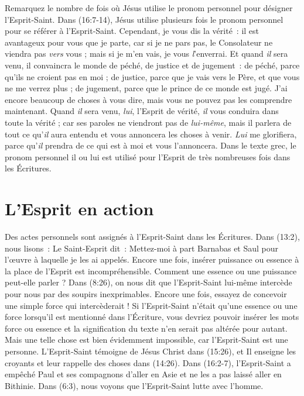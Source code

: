 Remarquez le nombre de fois où Jésus utilise le pronom personnel pour
 désigner l'Esprit-Saint. Dans (16:7-14), Jésus utilise
 plusieurs fois le pronom personnel pour se référer à l'Esprit-Saint.
 \og Cependant, je vous dis la vérité~: il est avantageux pour vous
 que je parte, car si je ne pars pas, le Consolateur ne viendra pas
 \emph{vers} vous ; mais si je m'en vais, je vous \emph{l}'enverrai.
 Et quand \emph{il} sera venu, il convaincra le monde de péché,
 de justice et de jugement~: de péché, parce qu'ils ne croient pas en moi ;
 de justice, parce que je vais vers le Père, et que vous ne me verrez plus ;
 de jugement, parce que le prince de ce monde est jugé.
 J'ai encore beaucoup de choses à vous dire, mais vous ne pouvez pas
 les comprendre maintenant. Quand \emph{il} sera venu, \emph{lui},
 l'Esprit de vérité, \emph{il} vous conduira dans toute la vérité ;
 car ses paroles ne viendront pas de \emph{lui-même}, mais il parlera de
 tout ce qu'\emph{il} aura entendu et vous annoncera les choses à venir.
 \emph{Lui} me glorifiera, parce qu'\emph{il} prendra de ce qui est à moi
 et vous l'annoncera. \fg{}
 Dans le texte grec, le pronom personnel \og il \fg{} ou \og lui \fg{}
 est utilisé pour l'Esprit de très nombreuses fois dans les Écritures.

\section*{L'Esprit en action}

Des actes personnels sont assignés à l'Esprit-Saint dans les Écritures. Dans
 (13:2), nous lisons~: \og Le Saint-Esprit dit~:
 Mettez-moi à part Barnabas et Saul pour l'œuvre à laquelle je les ai
 appelés. \fg{}
 Encore une fois, insérer \og puissance \fg{} ou \og essence \fg{} à la place
 de l'Esprit est incompréhensible. Comment une essence ou une puissance
 peut-elle parler ? Dans (8:26), on nous dit que l'Esprit-Saint
 lui-même intercède pour nous par des soupirs inexprimables.
 Encore une fois, essayez de concevoir une simple force qui intercèderait !
 Si l'Esprit-Saint n'était qu'une essence ou une force lorsqu'il est mentionné
 dans l'Écriture, vous devriez pouvoir insérer les mots \og force \fg{} ou
 \og essence \fg{} et la signification du texte n'en serait pas altérée pour
 autant. Mais une telle chose est bien évidemment impossible, car
 l'Esprit-Saint est une personne. L'Esprit-Saint témoigne de Jésus Christ dans
 (15:26), et Il enseigne les croyants et leur rappelle des choses
 dans (14:26). Dans (16:2-7), l'Esprit-Saint a
 empêché Paul et ses compagnons d'aller en Asie et ne les a pas laissé aller
 en Bithinie. Dans (6:3), nous voyons que l'Esprit-Saint lutte
 avec l'homme.

